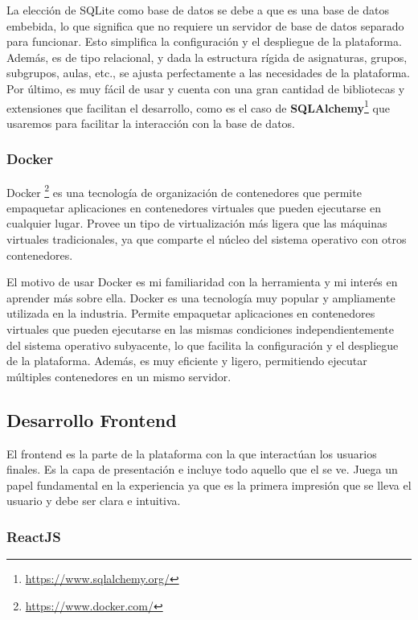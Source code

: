 La elección de SQLite como base de datos se debe a que es una base de datos embebida, lo que significa que no requiere un servidor de base de datos separado para funcionar. Esto simplifica la configuración y el despliegue de la plataforma. Además, es de tipo relacional, y dada la estructura rígida de asignaturas, grupos, subgrupos, aulas, etc., se ajusta perfectamente a las necesidades de la plataforma. Por último, es muy fácil de usar y cuenta con una gran cantidad de bibliotecas y extensiones que facilitan el desarrollo, como es el caso de \textbf{SQLAlchemy}\footnote{\url{https://www.sqlalchemy.org/}} que usaremos para facilitar la interacción con la base de datos.

\subsubsection*{Docker}

Docker \footnote{\url{https://www.docker.com/}} es una tecnología de organización de contenedores que permite empaquetar aplicaciones en contenedores virtuales que pueden ejecutarse en cualquier lugar. Provee un tipo de virtualización más ligera que las máquinas virtuales tradicionales, ya que comparte el núcleo del sistema operativo con otros contenedores.\newline

El motivo de usar Docker es mi familiaridad con la herramienta y mi interés en aprender más sobre ella. Docker es una tecnología muy popular y ampliamente utilizada en la industria. Permite empaquetar aplicaciones en contenedores virtuales que pueden ejecutarse en las mismas condiciones independientemente del sistema operativo subyacente, lo que facilita la configuración y el despliegue de la plataforma. Además, es muy eficiente y ligero, permitiendo ejecutar múltiples contenedores en un mismo servidor.

\subsection{Desarrollo Frontend}

El frontend es la parte de la plataforma con la que interactúan los usuarios finales. Es la capa de presentación e incluye todo aquello que el se ve. Juega un papel fundamental en la experiencia ya que es la primera impresión que se lleva el usuario y debe ser clara e intuitiva.\newline

\subsubsection*{ReactJS}


